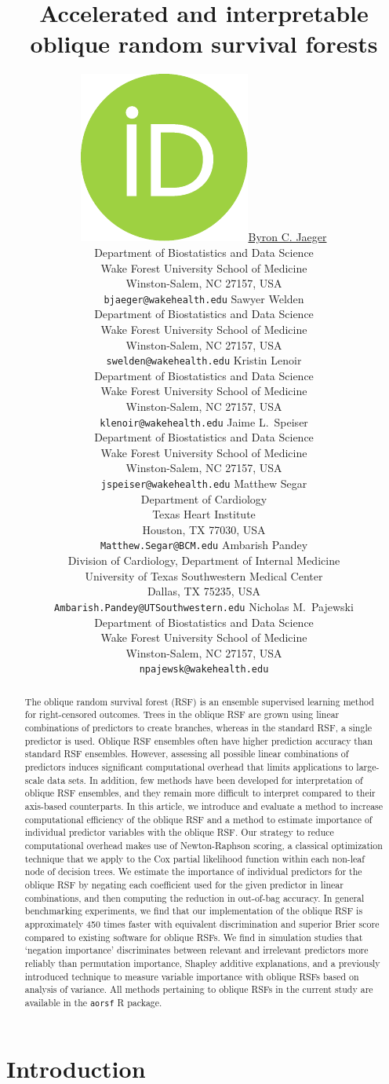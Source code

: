 \documentclass{article}\usepackage[]{graphicx}\usepackage[]{xcolor}
\title{Accelerated and interpretable oblique random survival forests}
\author{ \href{https://orcid.org/0000-0001-7399-2299}{\includegraphics[scale=0.06]{orcid.pdf}\hspace{1mm}Byron C. Jaeger} \\
	Department of Biostatistics and Data Science\\
	Wake Forest University School of Medicine\\
	Winston-Salem, NC 27157, USA \\
	\texttt{bjaeger@wakehealth.edu}
	\AND
   Sawyer Welden \\
   Department of Biostatistics and Data Science\\
   Wake Forest University School of Medicine\\
   Winston-Salem, NC 27157, USA \\
   \texttt{swelden@wakehealth.edu}
   \And
   Kristin Lenoir \\
   Department of Biostatistics and Data Science\\
   Wake Forest University School of Medicine\\
   Winston-Salem, NC 27157, USA \\
   \texttt{klenoir@wakehealth.edu}
	 \And
	 Jaime L.~Speiser \\
	 Department of Biostatistics and Data Science\\
	 Wake Forest University School of Medicine\\
	 Winston-Salem, NC 27157, USA \\
	 \texttt{jspeiser@wakehealth.edu}
	 \And
	 Matthew Segar \\
   Department of Cardiology \\
   Texas Heart Institute \\
   Houston, TX 77030, USA \\
	 \texttt{Matthew.Segar@BCM.edu}
   \And
	 Ambarish Pandey \\
   Division of Cardiology, Department of Internal Medicine \\
   University of Texas Southwestern Medical Center \\
   Dallas, TX 75235, USA \\
	 \texttt{Ambarish.Pandey@UTSouthwestern.edu}
	 \And
	 Nicholas M.~Pajewski \\
	 Department of Biostatistics and Data Science\\
	 Wake Forest University School of Medicine\\
	 Winston-Salem, NC 27157, USA \\
	 \texttt{npajewsk@wakehealth.edu}
}
\begin{document}
\maketitle




\begin{abstract}

	The oblique random survival forest (RSF) is an ensemble supervised learning method for right-censored outcomes. Trees in the oblique RSF are grown using linear combinations of predictors to create branches, whereas in the standard RSF, a single predictor is used. Oblique RSF ensembles often have higher prediction accuracy than standard RSF ensembles. However, assessing all possible linear combinations of predictors induces significant computational overhead that limits applications to large-scale data sets. In addition, few methods have been developed for interpretation of oblique RSF ensembles, and they remain more difficult to interpret compared to their axis-based counterparts. In this article, we introduce and evaluate a method to increase computational efficiency of the oblique RSF and a method to estimate importance of individual predictor variables with the oblique RSF. Our strategy to reduce computational overhead makes use of Newton-Raphson scoring, a classical optimization technique that we apply to the Cox partial likelihood function within each non-leaf node of decision trees. We estimate the importance of individual predictors for the oblique RSF by negating each coefficient used for the given predictor in linear combinations, and then computing the reduction in out-of-bag accuracy. In general benchmarking experiments, we find that our implementation of the oblique RSF is approximately 450 times faster with equivalent discrimination and superior Brier score compared to existing software for oblique RSFs. We find in simulation studies that `negation importance' discriminates between relevant and irrelevant predictors more reliably than permutation importance, Shapley additive explanations, and a previously introduced technique to measure variable importance with oblique RSFs based on analysis of variance. All methods pertaining to oblique RSFs in the current study are available in the \texttt{aorsf} R package.

\end{abstract}




\section{Introduction}
\end{document}
